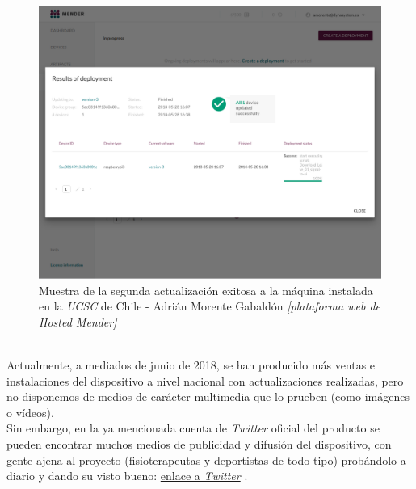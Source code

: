 \begin{figure}[H]
	\centering
	\includegraphics[width=\linewidth]{imagenes/ejemplo-actualizacion-exitosa.png}
	\caption{Muestra de la segunda actualización exitosa a la máquina instalada en la \textit{UCSC} de Chile - Adrián Morente Gabaldón \textit{[plataforma web de Hosted Mender]}}
	\label{dynasystem-ucsc-mender}
\end{figure}

\noindent\makebox[\linewidth]{\rule{\textwidth}{0.4pt}}\\

Actualmente, a mediados de junio de 2018, se han producido más ventas e instalaciones del dispositivo a nivel nacional con actualizaciones realizadas, pero no disponemos de medios de carácter multimedia que lo prueben (como imágenes o vídeos).\\

Sin embargo, en la ya mencionada cuenta de \textit{Twitter} oficial del producto se pueden encontrar muchos medios de publicidad y difusión del dispositivo, con gente ajena al proyecto (fisioterapeutas y deportistas de todo tipo) probándolo a diario y dando su visto bueno: \href{https:www.twitter.com/dynasystem\_}{enlace a \textit{Twitter}} \cite{twitter-dynasystem}.

\newpage